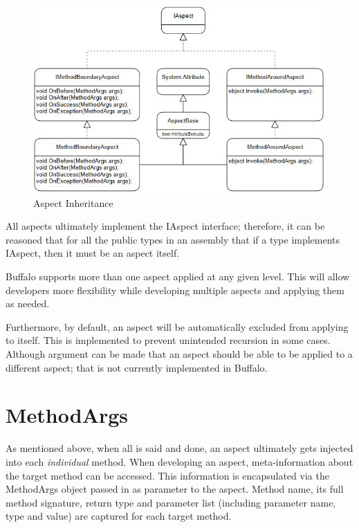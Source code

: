 \begin{figure}[H]
  \includegraphics[scale=1.0]{Uml02.PNG}
  \centering
  \caption{Aspect Inheritance\label{uml01}}
\end{figure}

All aspects ultimately implement the IAspect interface; therefore, it can be reasoned that for all the public types in an assembly that if a type implements IAspect, then it must be an aspect itself.

Buffalo supports more than one aspect applied at any given level. This will allow developers more flexibility while developing multiple aspects and applying them as needed.

Furthermore, by default, an aspect will be automatically excluded from applying to itself. This is implemented to prevent unintended recursion in some cases. Although argument can be made that an aspect should be able to be applied to a different aspect; that is not currently implemented in Buffalo.



\section{MethodArgs}

As mentioned above, when all is said and done, an aspect ultimately gets injected into each \textit{individual} method. When developing an aspect, meta-information about the target method can be accessed. This information is encapsulated via the MethodArgs object passed in as parameter to the aspect. Method name, its full method signature, return type and parameter list (including parameter name, type and value) are captured for each target method.

